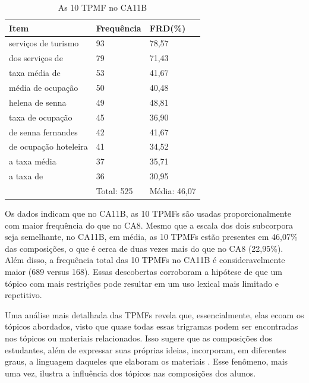 \documentclass[portuguese]{textolivre}
\begin{document}
\begin{table}[h]
\centering
\begin{threeparttable}
\caption{As 10 TPMF no CA11B}
\label{tab7}
\begin{tabular}{lll}   
\toprule
Item                  & Frequência & FRD(\%)       \\ 
\midrule
serviços de turismo   & 93         & 78,57        \\ 
dos serviços de       & 79         & 71,43        \\ 
taxa média de         & 53         & 41,67        \\ 
média de ocupação     & 50         & 40,48        \\ 
helena de senna       & 49         & 48,81        \\ 
taxa de ocupação      & 45         & 36,90        \\ 
de senna fernandes    & 42         & 41,67        \\ 
de ocupação hoteleira & 41         & 34,52        \\ 
a taxa média          & 37         & 35,71        \\ 
a taxa de             & 36         & 30,95        \\ 
                      & Total: 525 & Média: 46,07 \\ 
\bottomrule
\end{tabular}
\end{threeparttable}
\end{table}



Os dados indicam que no CA11B, as 10 TPMFs são usadas proporcionalmente com maior frequência do que no CA8. Mesmo que a escala dos dois subcorpora seja semelhante, no CA11B, em média, as 10 TPMFs estão presentes em 46,07\% das composições, o que é cerca de duas vezes mais do que no CA8 (22,95\%). Além disso, a frequência total das 10 TPMFs no CA11B é consideravelmente maior (689 versus 168). Essas descobertas corroboram a hipótese de que um tópico com mais restrições pode resultar em um uso lexical mais limitado e repetitivo.

Uma análise mais detalhada das TPMFs revela que, essencialmente, elas ecoam os tópicos abordados, visto que quase todas essas trigramas podem ser encontradas nos tópicos ou materiais relacionados. Isso sugere que as composições dos estudantes, além de expressar suas próprias ideias, incorporam, em diferentes graus, a linguagem daqueles que elaboram os materiais \cite{kreyer2017multilinguality}. Esse fenômeno, mais uma vez, ilustra a influência dos tópicos nas composições dos alunos.
\end{document}
